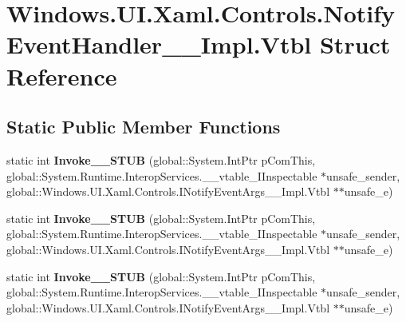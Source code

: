 \hypertarget{struct_windows_1_1_u_i_1_1_xaml_1_1_controls_1_1_notify_event_handler_____impl_1_1_vtbl}{}\section{Windows.\+U\+I.\+Xaml.\+Controls.\+Notify\+Event\+Handler\+\_\+\+\_\+\+Impl.\+Vtbl Struct Reference}
\label{struct_windows_1_1_u_i_1_1_xaml_1_1_controls_1_1_notify_event_handler_____impl_1_1_vtbl}
\subsection*{Static Public Member Functions}
\begin{DoxyCompactItemize}
\item 
\mbox{\label{struct_windows_1_1_u_i_1_1_xaml_1_1_controls_1_1_notify_event_handler_____impl_1_1_vtbl_a679ef554d9df4a12a0b4b3b766337a6c}} 
static int {\bfseries Invoke\+\_\+\+\_\+\+S\+T\+UB} (global\+::\+System.\+Int\+Ptr p\+Com\+This, global\+::\+System.\+Runtime.\+Interop\+Services.\+\_\+\+\_\+vtable\+\_\+\+I\+Inspectable $\ast$unsafe\+\_\+sender, global\+::\+Windows.\+U\+I.\+Xaml.\+Controls.\+I\+Notify\+Event\+Args\+\_\+\+\_\+\+Impl.\+Vtbl $\ast$$\ast$unsafe\+\_\+e)
\item 
\mbox{\label{struct_windows_1_1_u_i_1_1_xaml_1_1_controls_1_1_notify_event_handler_____impl_1_1_vtbl_a679ef554d9df4a12a0b4b3b766337a6c}} 
static int {\bfseries Invoke\+\_\+\+\_\+\+S\+T\+UB} (global\+::\+System.\+Int\+Ptr p\+Com\+This, global\+::\+System.\+Runtime.\+Interop\+Services.\+\_\+\+\_\+vtable\+\_\+\+I\+Inspectable $\ast$unsafe\+\_\+sender, global\+::\+Windows.\+U\+I.\+Xaml.\+Controls.\+I\+Notify\+Event\+Args\+\_\+\+\_\+\+Impl.\+Vtbl $\ast$$\ast$unsafe\+\_\+e)
\item 
\mbox{\label{struct_windows_1_1_u_i_1_1_xaml_1_1_controls_1_1_notify_event_handler_____impl_1_1_vtbl_a679ef554d9df4a12a0b4b3b766337a6c}} 
static int {\bfseries Invoke\+\_\+\+\_\+\+S\+T\+UB} (global\+::\+System.\+Int\+Ptr p\+Com\+This, global\+::\+System.\+Runtime.\+Interop\+Services.\+\_\+\+\_\+vtable\+\_\+\+I\+Inspectable $\ast$unsafe\+\_\+sender, global\+::\+Windows.\+U\+I.\+Xaml.\+Controls.\+I\+Notify\+Event\+Args\+\_\+\+\_\+\+Impl.\+Vtbl $\ast$$\ast$unsafe\+\_\+e)
$$
\end{DoxyCompactItemize}

